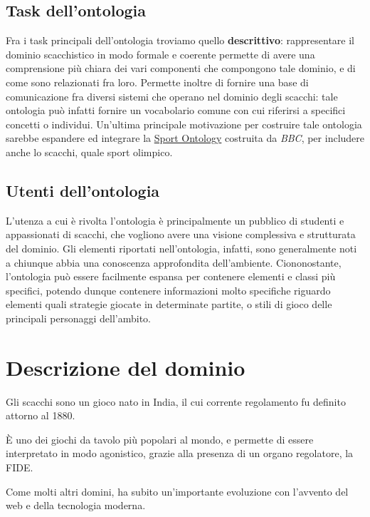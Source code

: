 \documentclass[12pt]{book}
\begin{document}
\section{Task dell'ontologia}

Fra i task principali dell'ontologia troviamo quello
\textbf{descrittivo}: rappresentare il dominio scacchistico in modo
formale e coerente permette di avere una comprensione più chiara dei
vari componenti che compongono tale dominio, e di come sono
relazionati fra loro. Permette inoltre di fornire una base di
comunicazione fra diversi sistemi che operano nel dominio degli
scacchi: tale ontologia può infatti fornire un vocabolario comune con
cui riferirsi a specifici concetti o individui. Un'ultima principale
motivazione per costruire tale ontologia sarebbe espandere ed
integrare la 
\href{https://www.bbc.co.uk/ontologies/sport-ontology/}{Sport Ontology} costruita da \textit{BBC}, per includere anche
lo scacchi, quale sport olimpico.


\section{Utenti dell'ontologia}

L'utenza a cui è rivolta l'ontologia è principalmente un pubblico di
studenti e appassionati di scacchi, che vogliono avere una visione
complessiva e strutturata del dominio. Gli elementi riportati nell'ontologia,
infatti, sono generalmente noti a chiunque abbia una conoscenza
approfondita dell'ambiente. Ciononostante, l'ontologia può essere
facilmente espansa per contenere elementi e classi più specifici,
potendo dunque contenere informazioni molto specifiche riguardo
elementi quali strategie giocate in determinate partite, o stili di
gioco delle principali personaggi dell'ambito.

\chapter{Descrizione del dominio}

Gli scacchi sono un gioco nato in India, il cui corrente regolamento 
fu definito attorno al 1880. 

È uno dei giochi da tavolo più popolari al mondo,
e permette di essere interpretato in modo agonistico,
grazie alla presenza di un organo regolatore, la FIDE.

Come molti altri domini, ha subito un'importante evoluzione con l'avvento del web e
della tecnologia moderna.
\end{document}
